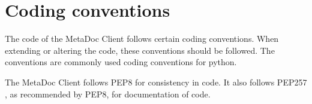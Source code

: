 \newpage
\section{Coding conventions}
\label{sec:coding_conventions}
The code of the MetaDoc Client follows certain coding conventions. When
extending or altering the code, these conventions should be followed. 
The conventions are commonly used coding conventions for python. 

The MetaDoc Client follows PEP8 \cite{pep8} for consistency in code. It also
follows PEP257 \cite{pep257}, as recommended by PEP8, for documentation of code. 

